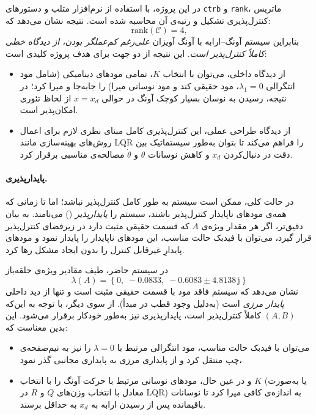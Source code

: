 \documentclass[a4paper,12pt]{article}
\begin{document}
در این پروژه، با استفاده از نرم‌افزار متلب و دستورهای
\texttt{ctrb} و \texttt{rank}،
ماتریس کنترل‌پذیری تشکیل و رتبه‌ی آن محاسبه شده است.
نتیجه نشان می‌دهد که:
\[
    \mathrm{rank}(\mathcal{C}) = 4,
\]
بنابراین سیستم آونگ–ارابه با آونگ آویزان
\emph{علی‌رغم کم‌عملگر بودن، از دیدگاه خطی کاملاً کنترل‌پذیر است}.
این نتیجه از دو جهت برای هدف پروژه کلیدی است:
\begin{itemize}
    \item از دیدگاه داخلی، می‌توان با انتخاب $K$، تمامی مودهای دینامیکی (شامل مود انتگرالی $\lambda_1=0$، مود حقیقی کند و مود نوسانی میرا) را جابه‌جا و میرا کرد؛ در نتیجه، رسیدن به نوسان بسیار کوچک آونگ در حوالی $x = x_d$ از لحاظ تئوری امکان‌پذیر است.
    \item از دیدگاه طراحی عملی، این کنترل‌پذیری کامل مبنای نظری لازم برای اعمال روش‌های بهینه‌سازی مانند LQR را فراهم می‌کند تا بتوان به‌طور سیستماتیک بین دقت در دنبال‌کردن $x_d$ و کاهش نوسانات $\theta$ و $\dot{\theta}$ مصالحه‌ی مناسبی برقرار کرد.
\end{itemize}

\paragraph{پایدارپذیری.}
در حالت کلی، ممکن است سیستم به طور کامل کنترل‌پذیر نباشد؛
اما تا زمانی که همه‌ی مودهای ناپایدار کنترل‌پذیر باشند،
سیستم را \emph{پایدارپذیر} () می‌نامند.
به بیان دقیق‌تر، اگر هر مقدار ویژه‌ی $A$ که قسمت حقیقی مثبت دارد
در زیرفضای کنترل‌پذیر قرار گیرد،
می‌توان با فیدبک حالت مناسب، این مودهای ناپایدار را پایدار نمود
و مودهای پایدارِ غیرقابل کنترل را بدون ایجاد مشکل رها کرد.

در سیستم حاضر، طیف مقادیر ویژه‌ی حلقه‌باز
\[
    \lambda(A) =
    \left\{
    0,\;
    -0.0833,\;
    -0.6083 \pm 4.8138\,\mathrm{j}
    \right\}
\]
نشان می‌دهد که سیستم فاقد مود با قسمت حقیقی مثبت است و تنها از دید داخلی \emph{پایدار مرزی} است (به‌دلیل وجود قطب در مبدأ).
از سوی دیگر، با توجه به این‌که $(A,B)$ کاملاً کنترل‌پذیر است،
پایدارپذیری نیز به‌طور خودکار برقرار می‌شود.
این بدین معناست که:
\begin{itemize}
    \item می‌توان با فیدبک حالت مناسب، مود انتگرالی مرتبط با $\lambda = 0$ را نیز به نیم‌صفحه‌ی چپ منتقل کرد و از پایداری مرزی به پایداری مجانبی گذر نمود،
    \item و در عین حال، مودهای نوسانی مرتبط با حرکت آونگ را با انتخاب $K$ (یا به‌صورت معادل با انتخاب وزن‌های $Q$ و $R$ در LQR) به اندازه‌ی کافی میرا کرد تا نوسانات باقیمانده پس از رسیدن ارابه به $x_d$ به حداقل برسند.
\end{itemize}
\end{document}
